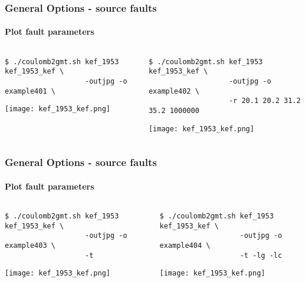 \begin{frame}[t,fragile]
  \frametitle{General Options - source faults}
  \framesubtitle{Plot fault parameters}
  \label{fr4:hist_pics}
\begin{columns}[t]
  \begin{column}{.5\textwidth}
\begin{scriptsize}
\begin{verbatim}
$ ./coulomb2gmt.sh kef_1953 kef_1953_kef \
                   -outjpg -o example401 \
\end{verbatim}
\end{scriptsize}
\centering
\texttt{[image: kef\_1953\_kef.png]}
  \end{column}
  \begin{column}{.5\textwidth}
  \begin{scriptsize}
\begin{verbatim}
$ ./coulomb2gmt.sh kef_1953 kef_1953_kef \
                   -outjpg -o example402 \
                   -r 20.1 20.2 31.2 35.2 1000000
\end{verbatim}
\end{scriptsize}
\centering
  \texttt{[image: kef\_1953\_kef.png]}
  \end{column}
\end{columns}

\end{frame}
\note{}

\begin{frame}[t,fragile]
  \frametitle{General Options - source faults}
  \framesubtitle{Plot fault parameters}
  \label{fr4:hist_pics}
\begin{columns}[t]
  \begin{column}{.5\textwidth}
\begin{scriptsize}
\begin{verbatim}
$ ./coulomb2gmt.sh kef_1953 kef_1953_kef \
                   -outjpg -o example403 \
                   -t
\end{verbatim}
\end{scriptsize}
\centering
\texttt{[image: kef\_1953\_kef.png]}
  \end{column}
  \begin{column}{.5\textwidth}
  \begin{scriptsize}
\begin{verbatim}
$ ./coulomb2gmt.sh kef_1953 kef_1953_kef \
                   -outjpg -o example404 \
                   -t -lg -lc
\end{verbatim}
\end{scriptsize}
\centering
  \texttt{[image: kef\_1953\_kef.png]}
  \end{column}
\end{columns}

\end{frame}
\note{}

